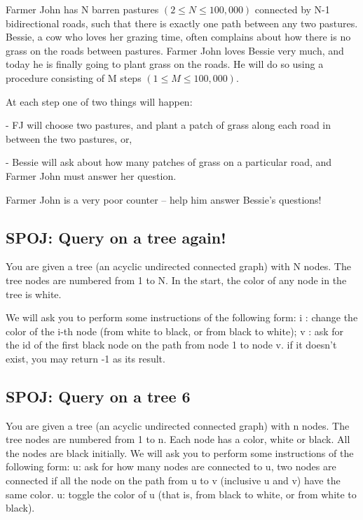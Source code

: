\documentclass{article}
\begin{document}
Farmer John has N barren pastures $(2 \leq N \leq 100,000)$ connected by N-1 
bidirectional roads, such that there is exactly one path between any two 
pastures.  Bessie, a cow who loves her grazing time, often complains about 
how there is no grass on the roads between pastures.  Farmer John loves 
Bessie very much, and today he is finally going to plant grass on the
roads.  He will do so using a procedure consisting of M steps $(1 \leq M \leq
100,000)$.

At each step one of two things will happen:

- FJ will choose two pastures, and plant a patch of grass along each road in
between the two pastures, or,

- Bessie will ask about how many patches of grass on a particular road, and 
Farmer John must answer her question.

Farmer John is a very poor counter -- help him answer Bessie's questions!

\subsection{SPOJ: Query on a tree again!}
You are given a tree (an acyclic undirected connected graph) with N nodes. The tree nodes are numbered from 1 to N. In the start, the color of any node in the tree is white.

We will ask you to perform some instructions of the following form:
 i : change the color of the i-th node (from white to black, or from black to white);
 v : ask for the id of the first black node on the path from node 1 to node v. if it doesn't exist, you may return -1 as its result.


\subsection{SPOJ: Query on a tree 6}

You are given a tree (an acyclic undirected connected graph) with n nodes. The tree nodes are numbered from 1 to n. Each node has a color, white or black. All the nodes are black initially. We will ask you to perform some instructions of the following form:
 u: ask for how many nodes are connected to u, two nodes are connected if all the node on the path from u to v (inclusive u and v) have the same color.
 u: toggle the color of u (that is, from black to white, or from white to black).
\end{document}
